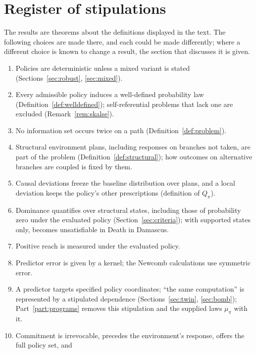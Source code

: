 \section{Register of stipulations}\label{app:stipulations}

The results are theorems about the definitions displayed in the text. The following choices are made
there, and each could be made differently; where a different choice is known to change a result, the
section that discusses it is given.

\begin{enumerate}[label=\arabic*.,ref=\arabic*,leftmargin=2em,itemsep=.3em]
  \item Policies are deterministic unless a mixed variant is stated (Sections~\ref{sec:robust},
        \ref{sec:mixed}).
  \item Every admissible policy induces a well-defined probability law (Definition~\ref{def:welldefined});
        self-referential problems that lack one are excluded (Remark~\ref{rem:skalse}).
  \item No information set occurs twice on a path (Definition~\ref{def:problem}).
  \item Structural environment plans, including responses on branches not taken, are part of the problem
        (Definition~\ref{def:structural}); how outcomes on alternative branches are coupled is fixed by
        them.
  \item Causal deviations freeze the baseline distribution over plans, and a local deviation keeps the
        policy's other prescriptions (definition of $Q_\pi$).
  \item Dominance quantifies over structural states, including those of probability zero under the
        evaluated policy (Section~\ref{sec:criteria}); with supported states only,  becomes
        unsatisfiable in Death in Damascus.
  \item Positive reach is measured under the evaluated policy.
  \item\label{stip:error} Predictor error is given by a kernel; the Newcomb calculations use symmetric error.
  \item A predictor targets specified policy coordinates; \enquote{the same computation} is represented
        by a stipulated dependence (Sections~\ref{sec:twin}, \ref{sec:bomb}); Part~\ref{part:programs}
        removes this stipulation and the supplied laws $\mu_\pi$ with it.
  \item Commitment is irrevocable, precedes the environment's response, offers the full policy set, and

\end{enumerate}
